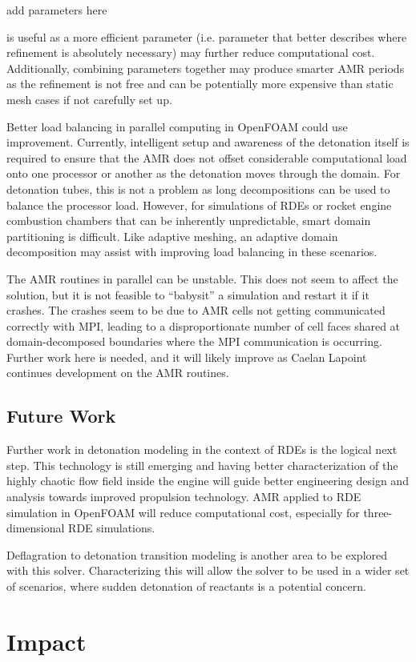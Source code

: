 {\color{red}\large add parameters here}

is useful as a more efficient parameter (i.e. parameter that better describes where refinement is absolutely necessary) may further reduce computational cost. Additionally, combining parameters together may produce smarter AMR periods as the refinement is not free and can be potentially more expensive than static mesh cases if not carefully set up. 

Better load balancing in parallel computing in OpenFOAM could use improvement. Currently, intelligent setup and awareness of the detonation itself is required to ensure that the AMR does not offset considerable computational load onto one processor or another as the detonation moves through the domain. For detonation tubes, this is not a problem as long decompositions can be used to balance the processor load. However, for simulations of RDEs or rocket engine combustion chambers that can be inherently unpredictable, smart domain partitioning is difficult. Like adaptive meshing, an adaptive domain decomposition may assist with improving load balancing in these scenarios. 

The AMR routines in parallel can be unstable. This does not seem to affect the solution, but it is not feasible to ``babysit'' a simulation and restart it if it crashes. The crashes seem to be due to AMR cells not getting communicated correctly with MPI, leading to a disproportionate number of cell faces shared at domain-decomposed boundaries where the MPI communication is occurring. Further work here is needed, and it will likely improve as Caelan Lapoint continues development on the AMR routines. 


\subsection{Future Work}
Further work in detonation modeling in the context of RDEs is the logical next step. This technology is still emerging and having better characterization of the highly chaotic flow field inside the engine will guide better engineering design and analysis towards improved propulsion technology. AMR applied to RDE simulation in OpenFOAM will reduce computational cost, especially for three-dimensional RDE simulations. 

Deflagration to detonation transition modeling is another area to be explored with this solver. Characterizing this will allow the solver to be used in a wider set of scenarios, where sudden detonation of reactants is a potential concern. 

\section{Impact}


